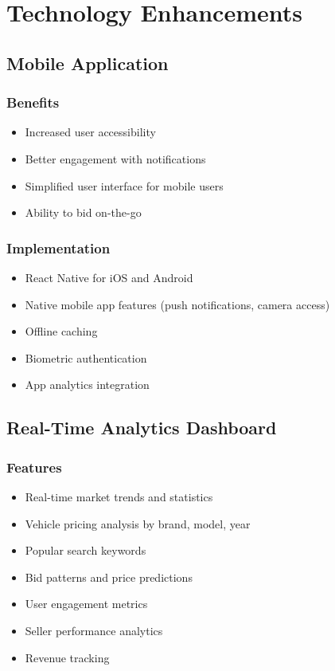 \section{Technology Enhancements}

\subsection{Mobile Application}

\subsubsection{Benefits}
\begin{itemize}
    \item Increased user accessibility
    \item Better engagement with notifications
    \item Simplified user interface for mobile users
    \item Ability to bid on-the-go
\end{itemize}

\subsubsection{Implementation}
\begin{itemize}
    \item React Native for iOS and Android
    \item Native mobile app features (push notifications, camera access)
    \item Offline caching
    \item Biometric authentication
    \item App analytics integration
\end{itemize}

\subsection{Real-Time Analytics Dashboard}

\subsubsection{Features}
\begin{itemize}
    \item Real-time market trends and statistics
    \item Vehicle pricing analysis by brand, model, year
    \item Popular search keywords
    \item Bid patterns and price predictions
    \item User engagement metrics
    \item Seller performance analytics
    \item Revenue tracking
\end{itemize}

